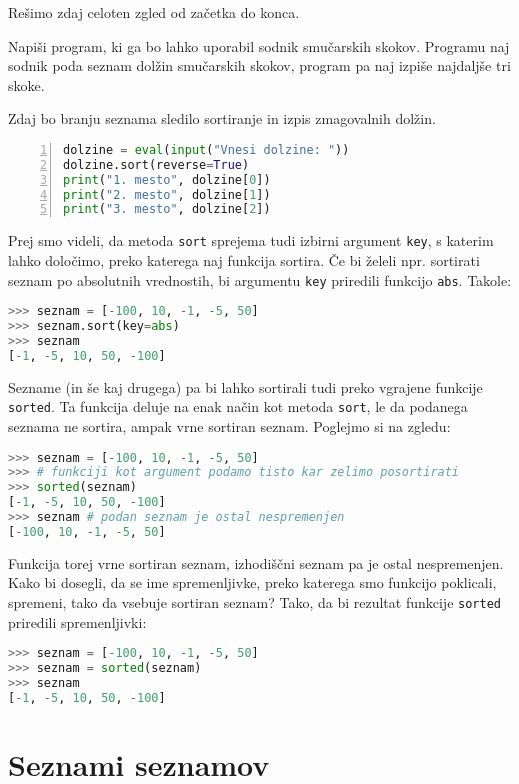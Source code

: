 Rešimo zdaj celoten zgled od začetka do konca.
\begin{zgled}
Napiši program, ki ga bo lahko uporabil sodnik smučarskih skokov. Programu naj sodnik poda seznam dolžin smučarskih skokov, program pa naj izpiše najdaljše tri skoke.
\end{zgled}

\begin{resitev}
Zdaj bo branju seznama sledilo sortiranje in izpis zmagovalnih dolžin.
\begin{lstlisting}[language=Python,numbers=left]
dolzine = eval(input("Vnesi dolzine: "))
dolzine.sort(reverse=True)
print("1. mesto", dolzine[0])
print("2. mesto", dolzine[1])
print("3. mesto", dolzine[2])
\end{lstlisting}
\end{resitev}

Prej smo videli, da metoda \texttt{sort} sprejema tudi izbirni argument \texttt{key}, s katerim lahko določimo, preko katerega naj funkcija sortira. Če bi želeli npr. sortirati seznam po absolutnih vrednostih, bi argumentu \texttt{key} priredili funkcijo \texttt{abs}. Takole:
\begin{lstlisting}[language=Python]
>>> seznam = [-100, 10, -1, -5, 50]
>>> seznam.sort(key=abs)
>>> seznam
[-1, -5, 10, 50, -100]
\end{lstlisting}

Sezname (in še kaj drugega) pa bi lahko sortirali tudi preko vgrajene funkcije \texttt{sorted}. Ta funkcija deluje na enak način kot metoda \texttt{sort}, le da podanega seznama ne sortira, ampak vrne sortiran seznam. Poglejmo si na zgledu:
\begin{lstlisting}[language=Python]
>>> seznam = [-100, 10, -1, -5, 50]
>>> # funkciji kot argument podamo tisto kar zelimo posortirati
>>> sorted(seznam) 
[-1, -5, 10, 50, -100]
>>> seznam # podan seznam je ostal nespremenjen
[-100, 10, -1, -5, 50]
\end{lstlisting}
Funkcija torej vrne sortiran seznam, izhodiščni seznam pa je ostal nespremenjen. Kako bi dosegli, da se ime spremenljivke, preko katerega smo funkcijo poklicali, spremeni, tako da vsebuje sortiran seznam? Tako, da bi rezultat funkcije \texttt{sorted} priredili spremenljivki:
\begin{lstlisting}[language=Python]
>>> seznam = [-100, 10, -1, -5, 50]
>>> seznam = sorted(seznam)
>>> seznam
[-1, -5, 10, 50, -100]
\end{lstlisting}

\section{Seznami seznamov}

